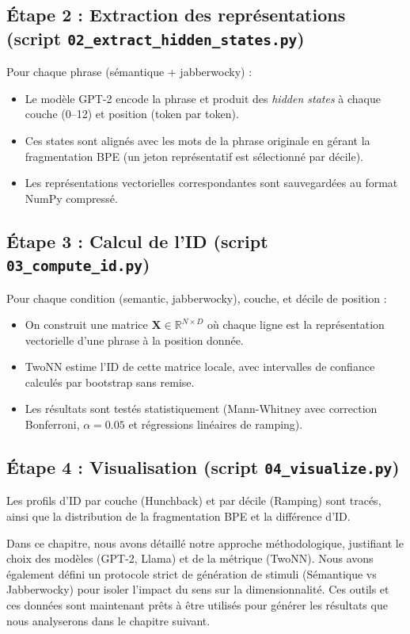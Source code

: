 \subsection{Étape 2 : Extraction des représentations (script \texttt{02\_extract\_hidden\_states.py})}
Pour chaque phrase (sémantique + jabberwocky) :
\begin{itemize}
    \item Le modèle GPT-2 encode la phrase et produit des \textit{hidden states} à chaque couche (0--12) et position (token par token).
    \item Ces states sont alignés avec les mots de la phrase originale en gérant la fragmentation BPE (un jeton représentatif est sélectionné par décile).
    \item Les représentations vectorielles correspondantes sont sauvegardées au format NumPy compressé.
\end{itemize}

\subsection{Étape 3 : Calcul de l'ID (script \texttt{03\_compute\_id.py})}
Pour chaque condition (semantic, jabberwocky), couche, et décile de position :
\begin{itemize}
    \item On construit une matrice $\mathbf{X} \in \mathbb{R}^{N \times D}$ où chaque ligne est la représentation vectorielle d'une phrase à la position donnée.
    \item TwoNN estime l'ID de cette matrice locale, avec intervalles de confiance calculés par bootstrap sans remise.
    \item Les résultats sont testés statistiquement (Mann-Whitney avec correction Bonferroni, $\alpha = 0.05$ et régressions linéaires de ramping).
\end{itemize}

\subsection{Étape 4 : Visualisation (script \texttt{04\_visualize.py})}
Les profils d'ID par couche (Hunchback) et par décile (Ramping) sont tracés, ainsi que la distribution de la fragmentation BPE et la différence d'ID.

Dans ce chapitre, nous avons détaillé notre approche méthodologique, justifiant le choix des modèles (GPT-2, Llama) et de la métrique (TwoNN). Nous avons également défini un protocole strict de génération de stimuli (Sémantique vs Jabberwocky) pour isoler l'impact du sens sur la dimensionnalité. Ces outils et ces données sont maintenant prêts à être utilisés pour générer les résultats que nous analyserons dans le chapitre suivant.